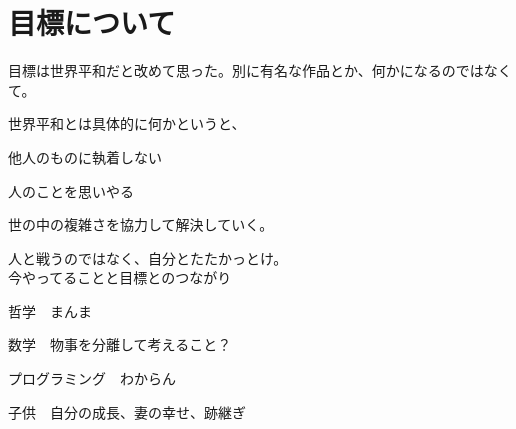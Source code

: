 \chapter{目標について}

目標は世界平和だと改めて思った。別に有名な作品とか、何かになるのではなくて。

世界平和とは具体的に何かというと、

他人のものに執着しない

人のことを思いやる

世の中の複雑さを協力して解決していく。

人と戦うのではなく、自分とたたかっとけ。\\

今やってることと目標とのつながり

哲学　まんま

数学　物事を分離して考えること？

プログラミング　わからん

子供　自分の成長、妻の幸せ、跡継ぎ

